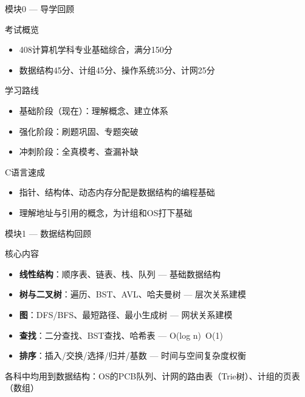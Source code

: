 \documentclass[10pt, aspectratio=169]{beamer}
\begin{document}
\begin{frame}{模块0 --- 导学回顾}
    \begin{block}{考试概览}
        \begin{itemize}
            \item 408计算机学科专业基础综合，满分150分
            \item 数据结构45分、计组45分、操作系统35分、计网25分
        \end{itemize}
    \end{block}
    \begin{block}{学习路线}
        \begin{itemize}
            \item 基础阶段（现在）：理解概念、建立体系
            \item 强化阶段：刷题巩固、专题突破
            \item 冲刺阶段：全真模考、查漏补缺
        \end{itemize}
    \end{block}
    \begin{block}{C语言速成}
        \begin{itemize}
            \item 指针、结构体、动态内存分配是数据结构的编程基础
            \item 理解地址与引用的概念，为计组和OS打下基础
        \end{itemize}
    \end{block}
\end{frame}

\begin{frame}{模块1 --- 数据结构回顾}
    \begin{block}{核心内容}
        \begin{itemize}
            \item \textbf{线性结构}：顺序表、链表、栈、队列 --- 基础数据结构
            \item \textbf{树与二叉树}：遍历、BST、AVL、哈夫曼树 --- 层次关系建模
            \item \textbf{图}：DFS/BFS、最短路径、最小生成树 --- 网状关系建模
            \item \textbf{查找}：二分查找、BST查找、哈希表 --- O(log n)~O(1)
            \item \textbf{排序}：插入/交换/选择/归并/基数 --- 时间与空间复杂度权衡
        \end{itemize}
    \end{block}
    \vspace{0.3em}
    \alert{各科中均用到数据结构：OS的PCB队列、计网的路由表（Trie树）、计组的页表（数组）}
\end{frame}
\end{document}
